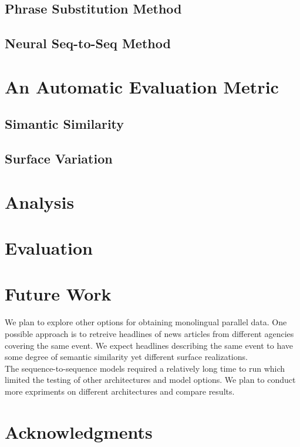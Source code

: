 \documentclass[11pt,letterpaper]{article}
\begin{document}
\subsection{Phrase Substitution Method}
\subsection{Neural Seq-to-Seq Method}

\section{An Automatic Evaluation Metric}
\subsection{Simantic Similarity}
\subsection{Surface Variation}

\section{Analysis}

\section{Evaluation}

\section{Future Work}
We plan to explore other options for obtaining monolingual parallel data. One possible approach is to retreive headlines of news articles from different agencies covering the same event. We expect headlines describing the same event to have some degree of semantic similarity yet different surface realizations.\\
The sequence-to-sequence models required a relatively long time to run which limited the testing of other architectures and model options. We plan to conduct more expriments on different architectures and compare results.  





\section*{Acknowledgments}



\end{document}
